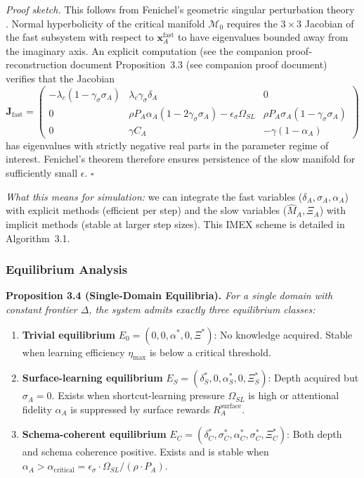 \documentclass[10pt]{article}
\begin{document}
\textit{Proof sketch.} This follows from Fenichel's geometric singular
perturbation theory \citep{fenichel1979geometric}. Normal hyperbolicity
of the critical manifold $\mathcal{M}_0$ requires the $3\times3$ Jacobian
of the fast subsystem with respect to $\mathbf{x}_A^{\text{fast}}$ to have
eigenvalues bounded away from the imaginary axis. An explicit computation
(see the companion proof-reconstruction document
Proposition~3.3 (see companion proof document) verifies that the Jacobian
\[
\mathbf{J}_{\text{fast}} = 
\begin{pmatrix}
-\lambda_c(1-\gamma_\sigma\sigma_A) & \lambda_c\gamma_\sigma\delta_A & 0 \\
0 & \rho P_A\alpha_A(1-2\gamma_\sigma\sigma_A)-\epsilon_\sigma\Omega_{SL} & \rho P_A\sigma_A(1-\gamma_\sigma\sigma_A) \\
0 & \gamma C_A & -\gamma(1-\alpha_A)
\end{pmatrix}
\]
has eigenvalues with strictly negative real parts in the parameter regime
of interest. Fenichel's theorem therefore ensures persistence of the
slow manifold for sufficiently small $\epsilon$. $\square$

\noindent\textit{What this means for simulation:} we can integrate the fast
variables ($\delta_A, \sigma_A, \alpha_A$) with explicit methods (efficient
per step) and the slow variables ($\hat{M}_A, \Xi_A$) with implicit methods
(stable at larger step sizes). This IMEX scheme is detailed in
Algorithm~3.1.

\subsubsection{Equilibrium Analysis}\label{sec:equilibrium}

\textbf{Proposition 3.4 (Single-Domain Equilibria).} %
\textit{For a single domain with constant frontier $\Delta$, the system
admits exactly three equilibrium classes:}
\begin{enumerate}[nosep]
\item \textbf{Trivial equilibrium} $E_0 = (0, 0, \alpha^*, 0, \Xi^*)$: No knowledge acquired. Stable when learning efficiency $\eta_{\max}$ is below a critical threshold.
\item \textbf{Surface-learning equilibrium} $E_S = (\delta_S^*, 0, \alpha_S^*, 0, \Xi_S^*)$: Depth acquired but $\sigma_A = 0$. Exists when shortcut-learning pressure $\Omega_{SL}$ is high or attentional fidelity $\alpha_A$ is suppressed by surface rewards $R_A^{\text{surface}}$.
\item \textbf{Schema-coherent equilibrium} $E_C = (\delta_C^*, \sigma_C^*, \alpha_C^*, \sigma_C^*, \Xi_C^*)$: Both depth and schema coherence positive. Exists and is stable when $\alpha_A > \alpha_{\text{critical}} = \epsilon_\sigma \cdot \Omega_{SL} / (\rho \cdot P_A)$.
\end{enumerate}
\end{document}
